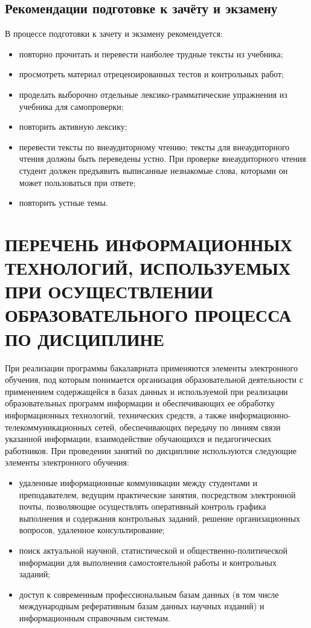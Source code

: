 \section{Рекомендации подготовке к зачёту и экзамену}
В процессе подготовки к зачету и экзамену рекомендуется:
\begin{itemize}
\item повторно прочитать и перевести наиболее трудные тексты из учебника;
\item просмотреть материал отрецензированных тестов и контрольных работ;
\item проделать выборочно отдельные лексико-грамматические упражнения из учебника для самопроверки;
\item повторить активную лексику;
\item перевести тексты по внеаудиторному чтению; тексты для внеаудиторного чтения должны быть переведены устно. При проверке внеаудиторного чтения студент должен предъявить выписанные незнакомые слова, которыми он может пользоваться при ответе;
\item повторить устные темы.
\end{itemize}

\chapter{ПЕРЕЧЕНЬ ИНФОРМАЦИОННЫХ ТЕХНОЛОГИЙ, ИСПОЛЬЗУЕМЫХ ПРИ ОСУЩЕСТВЛЕНИИ ОБРАЗОВАТЕЛЬНОГО ПРОЦЕССА ПО ДИСЦИПЛИНЕ}
\label{chapt10}
При реализации программы бакалавриата применяются элементы электронного обучения, под которым понимается организация образовательной деятельности с применением содержащейся в базах данных и используемой при реализации образовательных программ информации и обеспечивающих ее обработку информационных технологий, технических средств, а также информационно-телекоммуникационных сетей, обеспечивающих передачу по линиям связи указанной информации, взаимодействие обучающихся и педагогических работников. При проведении занятий по дисциплине используются следующие элементы электронного обучения:
\begin{itemize}
\item удаленные информационные коммуникации между студентами и преподавателем, ведущим практические занятия, посредством электронной почты, позволяющие осуществлять оперативный контроль графика выполнения и содержания контрольных заданий, решение организационных вопросов, удаленное консультирование;
\item поиск актуальной научной, статистической и общественно-политической информации для выполнения самостоятельной работы и контрольных заданий;
\item доступ к современным профессиональным базам данных (в том числе международным реферативным базам данных научных изданий) и информационным справочным системам.
\end{itemize}

